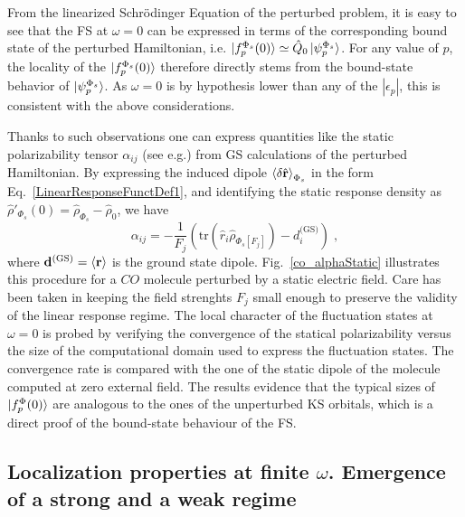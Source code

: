 \documentclass[reprint,aps,prb]{revtex4-1}
\newcommand{\eps}{\epsilon}
\newcommand{\be}{\begin{equation}}
\newcommand{\ee}{\end{equation}}
\newcommand{\op}[1]{\hat {#1}}
\newcommand{\trace}[1]{\mathrm{tr}\left(#1\right)}
\newcommand{\dmnot}{\op{\rho}_0}
\newcommand{\dm}{\op{\rho}}
\begin{document}
From the linearized Schr\"odinger Equation of the perturbed problem, it is easy to see that the FS at $\omega=0$ can be expressed
in terms of the corresponding bound state of the perturbed Hamiltonian, i.e.
$\ket{f_p^{\Phi_s}(0)} \simeq \op Q_0 \ket{\psi_p^{\Phi_s}}$.
For any value of $p$, the locality of the $\ket{f_p^{\Phi_s}(0)}$ therefore directly stems from the
bound-state behavior of $\ket{\psi_p^{\Phi_s}}$. As $\omega=0$ is by hypothesis
lower than any of the $|\eps_p|$, this is consistent with the above considerations.

Thanks to such observations one can express quantities like the static polarizability tensor $\alpha_{ij}$ (see e.g.\cite{DebElecField}) from GS calculations of the perturbed Hamiltonian.
By expressing the induced dipole $\braket{\delta \op{\mathbf r}}_{\Phi_s}$ in the form Eq.~\eqref{LinearResponseFunctDef1}, and identifying the static response density as $\dm'_{\Phi_s}(0) = \dm_{\Phi_s} -\dmnot $, we have
\be \label{staticalpha}
\alpha_{ij} =
-\frac{1}{F_j} \left(\trace{\op r_i \dm_{\Phi_s[F_j]}} - d^{\text{(GS)}}_i \right)\;,
\ee
where $\mathbf d^\text{(GS)}=\braket{\mathbf r}$ is the ground state dipole.
Fig.~\eqref{co_alphaStatic} illustrates this procedure for a $CO$ molecule
perturbed by a static electric field.
Care has been taken in keeping the field strenghts $F_j$ small enough to
preserve the validity of the linear response regime.
The local character of the fluctuation states at $\omega=0$ is
probed by verifying the convergence of the statical polarizability versus
the size of the computational domain used to express the fluctuation states. The convergence rate is compared with the
one of the static dipole of the molecule computed at zero external field.
The results evidence that the typical sizes of $\ket{f^\Phi_p(0)}$ are analogous to the ones of the unperturbed KS orbitals, which is a direct proof of the bound-state behaviour of the FS.

\subsection{Localization properties at finite $\omega$. Emergence of a strong and a weak regime}
\end{document}
